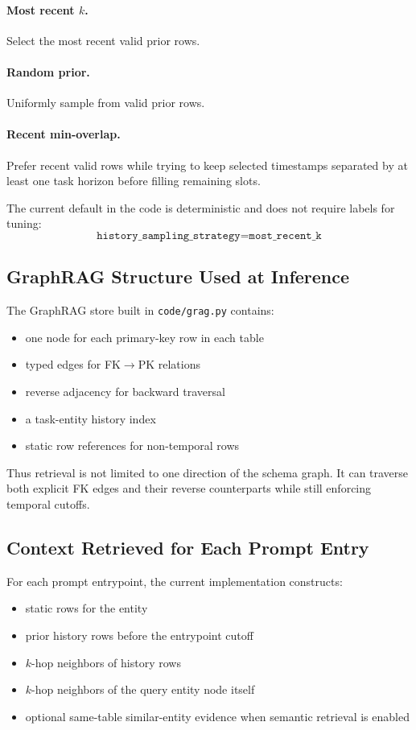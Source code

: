 \documentclass[11pt]{article}
\begin{document}
\paragraph{Most recent $k$.}
Select the most recent valid prior rows.

\paragraph{Random prior.}
Uniformly sample from valid prior rows.

\paragraph{Recent min-overlap.}
Prefer recent valid rows while trying to keep selected timestamps separated by at least one task horizon before filling remaining slots.

The current default in the code is deterministic and does not require labels for tuning:
\begin{equation}
\texttt{history\_sampling\_strategy} = \texttt{most\_recent\_k}
\end{equation}

\subsection{GraphRAG Structure Used at Inference}

The GraphRAG store built in \texttt{code/grag.py} contains:
\begin{itemize}
\item one node for each primary-key row in each table
\item typed edges for FK$\rightarrow$PK relations
\item reverse adjacency for backward traversal
\item a task-entity history index
\item static row references for non-temporal rows
\end{itemize}

Thus retrieval is not limited to one direction of the schema graph. It can traverse both explicit FK edges and their reverse counterparts while still enforcing temporal cutoffs.

\subsection{Context Retrieved for Each Prompt Entry}

For each prompt entrypoint, the current implementation constructs:
\begin{itemize}
\item static rows for the entity
\item prior history rows before the entrypoint cutoff
\item $k$-hop neighbors of history rows
\item $k$-hop neighbors of the query entity node itself
\item optional same-table similar-entity evidence when semantic retrieval is enabled
\end{itemize}
\end{document}

